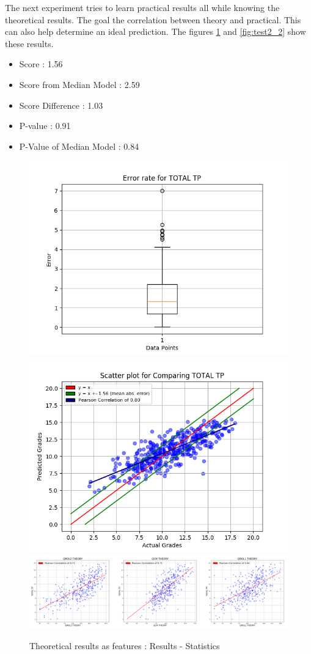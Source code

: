 \documentclass[a4paper,11pt]{report}
\numberwithin{figure}{section} %
\begin{document}
    The next experiment tries to learn practical results all while knowing the theoretical results.
    The goal the correlation between theory and practical.
    This can also help determine an ideal prediction.
    The figures \ref{fig:test2_1} and \ref{fig:test2_2} show these results.
    \begin{itemize}
        \item[\textbullet] Score : 1.56
        \item[\textbullet] Score from Median Model : 2.59
        \item[\textbullet] Score Difference : 1.03
        \item[\textbullet] P-value : 0.91
        \item[\textbullet] P-Value of Median Model : 0.84
    \end{itemize}
      \begin{figure}[H]
      \centering
      \includegraphics[width=.40\linewidth]{plots/test2_cv_boxplot_TOTAL_TP_2018-05-18_14_11_28.png}
      \includegraphics[width=.40\linewidth]{plots/test2_cv_comp_TOTAL_TP_2018-05-18_14_11_28.png}\\
      \includegraphics[width=.95\linewidth]{plots/test2_var_correlation_TOTAL_TP_2018-05-18_02_51_44.png}
      \caption{Theoretical results as features : Results - Statistics}
      \label{fig:test2_1}
      \end{figure}
\end{document}
